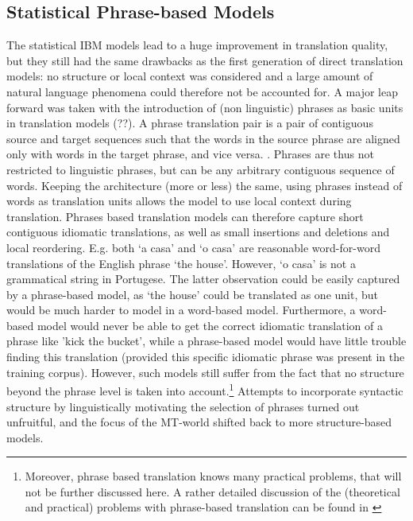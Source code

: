 \documentclass{report}
\theoremstyle{definition}
\theoremstyle{plain}
\begin{document}
\subsection{Statistical Phrase-based Models}

The statistical IBM models lead to a huge improvement in translation quality, but they still had the same drawbacks as the first generation of direct translation models: no structure or local context was considered and a large amount of natural language phenomena could therefore not be accounted for. A major leap forward was taken with the introduction of (non linguistic) phrases as basic units in translation models (\cite{wang1998grammar,och1999improved}??). A phrase translation pair is a pair of contiguous source and target sequences such that the words in the source phrase are aligned only with words in the target phrase, and vice versa. \citep{och2004alignment}. Phrases are thus not restricted to linguistic phrases, but can be any arbitrary contiguous sequence of words. Keeping the architecture (more or less) the same, using phrases instead of words as translation units allows the model to use local context during translation. Phrases based translation models can therefore capture short contiguous idiomatic translations, as well as small insertions and deletions and local reordering. E.g. both `a casa' and `o casa' are reasonable word-for-word translations of the English phrase `the house'. However, `o casa' is not a grammatical string in Portugese. The latter observation could be easily captured by a phrase-based model, as `the house' could be translated as one unit, but would be much harder to model in a word-based model. Furthermore, a word-based model would never be able to get the correct idiomatic translation of a phrase like 'kick the bucket', while a phrase-based model would have little trouble finding this translation (provided this specific idiomatic phrase was present in the training corpus). However, such models still suffer from the fact that no structure beyond the phrase level is taken into account.\footnote{Moreover, phrase based translation knows many practical problems, that will not be further discussed here. A rather detailed discussion of the (theoretical and practical) problems with phrase-based translation can be found in \cite{quirk2006we}} Attempts to incorporate syntactic structure by linguistically motivating the selection of phrases \citep{koehn2003statistical} turned out unfruitful, and the focus of the MT-world shifted back to more structure-based models.
\end{document}
